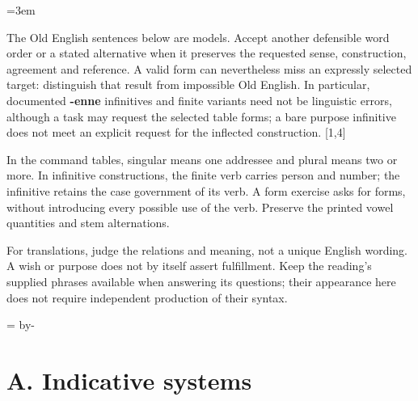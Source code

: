 \newcommand{\runningtitle}{Unit 6. Answer key}

\emergencystretch=3em
\newcommand{\itempara}[2]{\par\addvspace{3pt}\noindent\hangindent=1.8em\hangafter=1\makebox[1.8em][l]{#1.}#2\par}
\newcommand{\reserve}[1]{\par\penalty-100\begingroup\dimen0=\pagegoal\advance\dimen0 by-\pagetotal\ifdim\dimen0<#1\newpage\fi\endgroup}

\raggedright
{}

The Old English sentences below are models. Accept another defensible word order or a stated alternative when it preserves the requested sense, construction, agreement and reference. A valid form can nevertheless miss an expressly selected target: distinguish that result from impossible Old English. In particular, documented \textbf{-enne} infinitives and finite variants need not be linguistic errors, although a task may request the selected table forms; a bare purpose infinitive does not meet an explicit request for the inflected construction. [1,4]

In the command tables, singular means one addressee and plural means two or more. In infinitive constructions, the finite verb carries person and number; the infinitive retains the case government of its verb. A form exercise asks for forms, without introducing every possible use of the verb. Preserve the printed vowel quantities and stem alternations.

For translations, judge the relations and meaning, not a unique English wording. A wish or purpose does not by itself assert fulfillment. Keep the reading’s supplied phrases available when answering its questions; their appearance here does not require independent production of their syntax.

\reserve{7\baselineskip}
\section*{A. Indicative systems}

